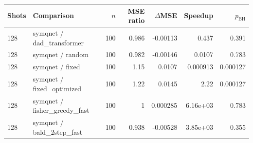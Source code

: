\begin{tabular}{llrrrrr}
\toprule
Shots & Comparison & $n$ & MSE ratio & $\Delta$MSE & Speedup & $p_{\mathrm{BH}}$ \\
\midrule
128 & symqnet / dad\_transformer & 100 & 0.986 & -0.00113 & 0.437 & 0.391 \\
128 & symqnet / random & 100 & 0.982 & -0.00146 & 0.0107 & 0.783 \\
128 & symqnet / fixed & 100 & 1.15 & 0.0107 & 0.000913 & 0.000127 \\
128 & symqnet / fixed\_optimized & 100 & 1.22 & 0.0145 & 2.22 & 0.000127 \\
128 & symqnet / fisher\_greedy\_fast & 100 & 1 & 0.000285 & 6.16e+03 & 0.783 \\
128 & symqnet / bald\_2step\_fast & 100 & 0.938 & -0.00528 & 3.85e+03 & 0.355 \\
\bottomrule
\end{tabular}
